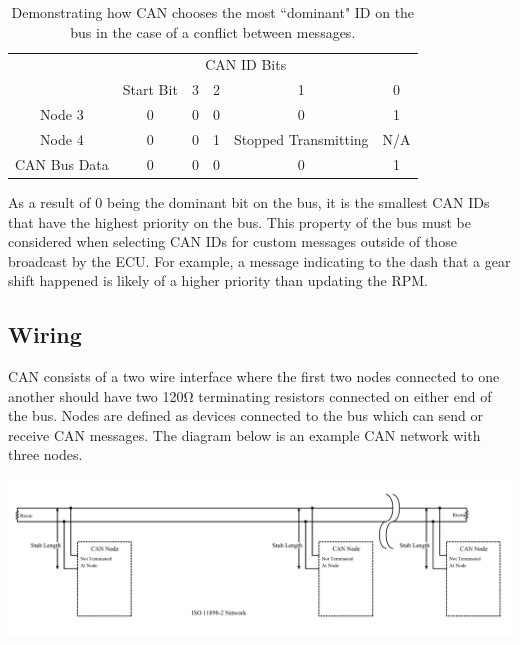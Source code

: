 \documentclass[letterpaper]{article}
\begin{document}
\begin{center}
  \begin{table}
  \begin{tabular}{c|c|c|c|c|c|}
    \cline{2-6}
      & \multicolumn{4}{c}{CAN ID Bits} & \\
    \cline{2-6}
      & Start Bit & 3 & 2 & 1 & 0\\
    \cline{1-6}
      \multicolumn{1}{|c|}{Node 3} & 0 & 0 & 0 & 0 & 1 \\
    \cline{1-6}
      \multicolumn{1}{|c|}{Node 4} & 0 & 0 & 1 & Stopped Transmitting & N/A \\
    \cline{1-6}
      \multicolumn{1}{|c|}{CAN Bus Data} & 0 & 0 & 0 & 0 & 1 \\
    \hline
  \end{tabular}
  \caption{
  \label{tab:Address Conflict Resolution}
    Demonstrating how CAN chooses the most ``dominant" ID on the bus in the
    case of a conflict between messages.
  }
  \end{table}
\end{center}

As a result of 0 being the dominant bit on the bus, it is the smallest
CAN IDs that have the highest priority on the bus. This property of the bus must
be considered when selecting CAN IDs for custom messages outside of those
broadcast by the ECU. For example, a message indicating to the dash that a gear
shift happened is likely of a higher priority than updating the RPM.

\subsection{Wiring}
CAN consists of a two wire interface where the first two nodes connected to one
another should have two 120\si{\ohm} terminating resistors connected on either
end of the bus. Nodes are defined as devices connected to the bus which can send
or receive CAN messages. The diagram below is an example CAN network with three nodes.

\begin{center}
  \includegraphics[width=\textwidth]{CAN-network-diagram}
\end{center}
\end{document}
